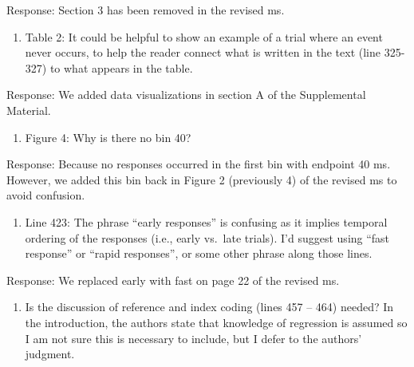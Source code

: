 \documentclass[
]{article}
\providecommand{\tightlist}{%
  \setlength{\itemsep}{0pt}\setlength{\parskip}{0pt}}
\renewenvironment{quote}{\begin{leftbar}}{\end{leftbar}}
\begin{document}
Response: Section 3 has been removed in the revised ms.

\begin{quote}
\begin{enumerate}
\def\labelenumi{\arabic{enumi}.}
\setcounter{enumi}{7}
\tightlist
\item
  Table 2: It could be helpful to show an example of a trial where an
  event never occurs, to help the reader connect what is written in the
  text (line 325-327) to what appears in the table.
\end{enumerate}
\end{quote}

Response: We added data visualizations in section A of the Supplemental
Material.

\begin{quote}
\begin{enumerate}
\def\labelenumi{\arabic{enumi}.}
\setcounter{enumi}{8}
\tightlist
\item
  Figure 4: Why is there no bin 40?
\end{enumerate}
\end{quote}

Response: Because no responses occurred in the first bin with endpoint
40 ms. However, we added this bin back in Figure 2 (previously 4) of the
revised ms to avoid confusion.

\begin{quote}
\begin{enumerate}
\def\labelenumi{\arabic{enumi}.}
\setcounter{enumi}{9}
\tightlist
\item
  Line 423: The phrase ``early responses'' is confusing as it implies
  temporal ordering of the responses (i.e., early vs.~late trials). I'd
  suggest using ``fast response'' or ``rapid responses'', or some other
  phrase along those lines.
\end{enumerate}
\end{quote}

Response: We replaced early with fast on page 22 of the revised ms.

\begin{quote}
\begin{enumerate}
\def\labelenumi{\arabic{enumi}.}
\setcounter{enumi}{10}
\tightlist
\item
  Is the discussion of reference and index coding (lines 457 -- 464)
  needed? In the introduction, the authors state that knowledge of
  regression is assumed so I am not sure this is necessary to include,
  but I defer to the authors' judgment.
\end{enumerate}
\end{quote}
\end{document}
